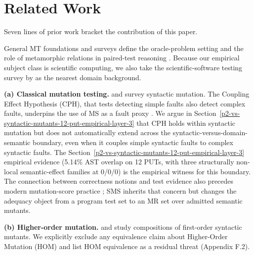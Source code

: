 \documentclass[manuscript,screen,review]{acmart}
\begin{document}
\section{Related Work}\label{related-work-and-roadmap}

Seven lines of prior work bracket the contribution of this paper.

General MT foundations and surveys define the oracle-problem setting and
the role of metamorphic relations in paired-test reasoning
\citep{chen2018metamorphic,segura2016survey,liu2014alleviate}. Because
our empirical subject class is scientific computing, we also take the
scientific-software testing survey by \citet{kanewala2014scientific} as
the nearest domain background.

\textbf{(a) Classical mutation testing.} \citet{d7c38286734419b52de4262c9802ebdfcf4b9447} and
\citet{d461ab9482b7fb5eadd7e6cd2c6dffced8ede8b8} survey syntactic mutation. The Coupling Effect
Hypothesis (CPH), that tests detecting simple faults also detect complex
faults, underpins the use of MS as a fault proxy \citep{demillo1978hints,andrews2005mutation,just2014mutants}. We
argue in Section~\ref{p2-vs-syntactic-mutants-12-put-empirical-layer-3} that CPH holds within syntactic mutation but does not
automatically extend across the syntactic-versus-domain-semantic
boundary, even when it couples simple syntactic faults to complex
syntactic faults. The Section~\ref{p2-vs-syntactic-mutants-12-put-empirical-layer-3} empirical evidence (5.14\% AST overlap on 12
PUTs, with three structurally non-local semantic-effect families at
0/0/0) is the empirical witness for this
boundary. The connection between correctness notions and test evidence
also precedes modern mutation-score practice \citep{budd1982correctness};
SMS inherits that concern but changes the adequacy object from a program
test set to an MR set over admitted semantic mutants.

\textbf{(b) Higher-order mutation.} \citet{c03829bdd1a6e45113092384bf0fa05a064ca54a} and \citet{kintis2018effective}
study compositions of first-order syntactic mutants. We
explicitly exclude any equivalence claim about Higher-Order Mutation
(HOM) and list HOM equivalence as a residual threat (Appendix F.2).
\end{document}
